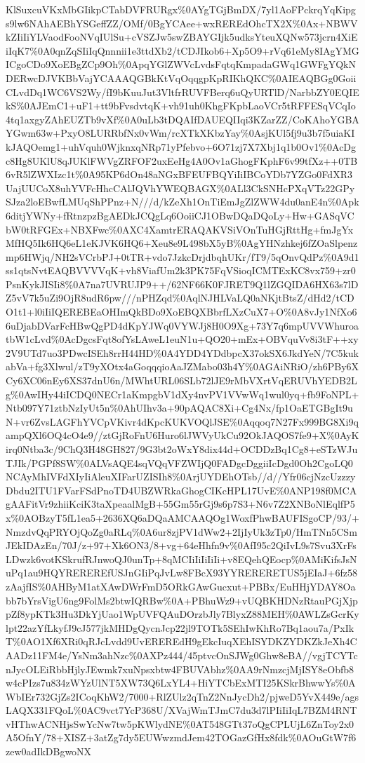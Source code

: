 \documentclass[]{article}
\begin{document}
KlSuxcuVKxMbGIikpCTabDVFRURgx\%0AYgTGjBmDX/7yl1AoFPckrqYqKipgs9lw6NAhAEBhYSGeffZZ/OMf/0BgYCAee+wxREREdOhcTX2X\%0Ax+NBWVkZIiIiYLVaodFooNVqIUlSu+cVSZJw5swZBAYGIjk5udksYteuXQNw573jcrn4XiEiIqK7\%0A0qnZqSIiIqQnnnii1e3ttdXb2/tCDJIkob6+Xp5O9+rVq61eMy8IAgYMGICgoCDo9XoEBgZCp9Oh\%0ApqYGlZWVcLvdsFqtqKmpadaGWq1GWFgYQkNDERwcDJVKBbVajYCAAAQGBkKtVqOqqgpKpRIKhQKC\%0AIEAQBGg0GoiiCLvdDq1WC6VS2Wy/fI9bKuuJut3VltfrRUVFBerq6uQyURTlD/NarbbZY0EQIEkS\%0AJEmC1+uF1+tt9bFvsdvtqK+vh91uh0KhgFKpbLaoVCr5tRFFESqVCqIo4tq1axgyZAhEUZTb9vXf\%0A0uLb3tDQAIfDAUEQIIqi3KZarZZ/CoKAhoYGBAYGwm63w+PxyO8LURRbfNx0vWm/rcXTkXKbzYay\%0AsjKUl5fj9u3b7f5uiaKIkJAQOemg1+uhVquh0WjknxqNRp71yPfebvo+6O71zj7X7Xbj1q1b0Ov1\%0AcDgc8Hg8UKlU8qJUKlFWVgZRFOF2uxEeHg4A0Ov1aGhogFKphF6v99tfXz++0TB6vR5lZWXIzc1t\%0A95KP6dOn48aNGxBFEUFBQYiIiIBCoYDb7YZGo0FdXR3UajUUCoX8uhYVFcHhcCAlJQVhYWEQBAGX\%0ALl3CkSNHcPXqVTz22GPySJza2loEBwfLMUqShPPnz+N///d/kZeXh1OnTiEmJgZlZWW4du0anE4n\%0Apk6ditjYWNy+fRtnzpzBgAEDkJCQgLq6OoiiCJ1OBwDQaDQoLy+Hw+GASqVCbW0tRFGEx+NBXFwc\%0AXC4XamtrERAQAKVSiVOnTuHGjRttHg+fmJgYxMfHQ5Ik6HQ6eL1eKJVK6HQ6+Xeu8e9L498bX5yB\%0AgYHNzhkej6fZOaSlpenzmp6HWjq/NH2sVCrbPJ+0tTR+vdo7JzkcDrjdbqhUKr/fT9/5qOnvQdPz\%0A9d1ss1qtsNvtEAQBVVVVqK+vh8ViafUm2k3PK75FqVSioqICMTExKC8vx759+zr0PsnKykJISIi8\%0A7na7UVRUJP9++/62NF66K0FJRET9Q1lZGQIDA6HX63s7lDZ5vV7k5uZi9OjR8udR6pw///nPHZqd\%0AqlNJHLVaLQ0aNKjtBtsZ/dHd2/tCDO1t1+l0iIiIQEREBEaOHImQkBDo9XoEBQXBbrfLXzCuX7+O\%0A8vJy1NfXo66uDjabDVarFcHBwQgPD4dKpYJWq0VYWJj8H0O9Xg+73Y7q6mpUVVWhuroatbW1cLvd\%0AcDgcsFqt8ofYsLAweL1euN1u+QO20+mEx+OBVquVv8i3tF++xy2V9UTd7uo3PDwcISEh8rrH44HD\%0A4YDD4YDdbpcX37okSX6JkdYeN/7C5kukabVa+fg3Xlwul/zT9yXOtx4aGoqqqioAaJZMabo03h4Y\%0AGAiNRiO/zh6PBy6XCy6XC06nEy6XS37dnU6n/MWhtURL06SLb72lJE9rMbVXrtVqERUVhYEDB2Lg\%0AwIHy44iICDQ0NECr1aKmpgbV1dXy4nvPV1VVwWq1wul0yq+fb9FoNPL+Ntb097Y71ztbNzIyUt5n\%0AhUIhv3a+90pAQAC8Xi+Cg4Nx/fp1OaETGBgIt9uN+vr6ZvsLAGFhYVCpVKivr4dKpcKUKVOQlJSE\%0Aqqoq7N27Fx999BG8Xi9qampQXl6OQ4cO4e9//ztGjRoFnU6Huro6lJWVyUkCu92OkJAQOS7fe9+X\%0AyKirq0Ntba3c/9ChQ3H48GH827/9G3bt2oWxY8dix44d+OCDDzBq1Cg8+eSTzWJuTJIk/PGPf8SW\%0ALVsAQE4sqVQqVFZWIjQ0FADgcDggiiIcDgd0Oh2CgoLQ0NCAyMhIVFdXIyIiAleuXIFarUZISIh8\%0ArjUYDEhOTsb//d//Yfr06cjNzcUzzzyDbdu2ITU1FVarFSdPnoTD4UBZWRkaGhogCIKcHPL17UvE\%0ANP198f0MCAgAAFitVr9zhiiKciK3taXpeaalMgB+55Gm55rGj9s6p7S3+N6v7Z2XNBoNlEqlfP5x\%0AOBzyT5fL1ea5+2636XQ6aDQaAMCAAQOg1WoxfPhwBAUFISgoCP/93/+NmzdvQqPRYOjQoZg0aRLq\%0A6ur8zjPV1dWw2+2IjIyUk3zTp0/HmTNn5CSmJEkIDAzEn/70J/z+97+Xk6ON3/8+vg+64eHhfn9v\%0AfI95c2QiIvL9s7Svu3XrFsLDwzk6votKSkrufRJnwoQJ0unTp+8qMCIiIiIiIiIi+v8EQehQEocp\%0AMiKifsJsNuPq1au9HQYREREREfUSJnGIiPqJvLw8FBcX93YYRERERETUS5jEIaJ+6fz58zAajfIS\%0AHByM1atXAwDWrFmD5ORkGAwGucxut+PBBx/EuHHjYDAY8Oabb7bYrsVigU6ng9FolMs2btwIQRBw\%0A+PBhuWz9+vUQBKHDNzRtauPGjXjppZf8ypKTk3Hu3DkYjUao1WpUVFQAuDOrzbJly7BlyxZ88MEH\%0AWLZsGcrKylpt22azYfLkyfJ9cJ577jkMHDgQycnJcp22jl9TOTk5SEhIwKhRo7Bq1aou7a/PxIkT\%0AO1Xf6XRi0qRJcLvdd9UvEREREdH9gEkcIuqXEhISYDKZYDKZkJeXh4CAADz11FM4e/YsNm3ahNzc\%0AXPz444/45ptvcOnSJWg0Ghw8eBA//vgjTCYTcnJycOLEiRbbHjlyJEwmk7xuNpsxbtw4FBUVAbhz\%0AA9rNmzcjMjISY8eObfb8w4cPIzs7u834zWYzUlNT5XW73Q6LxYL4+HiYTCbExMTI25KSkrBhwwYs\%0AWbIEr732GjZs2ICoqKhW2/7000+RlZUlz2qTnZ2NnJycDh2/pjweD5YvX449e/agsLAQX331FQoL\%0AC9vct7YcP368U/XVajWmTJmC7du3d7lPIiIiIqL7BZM4RNTvHThwACNHjsSwYcNw7tw5pKWlydNE\%0AT548GTt37oQgCPLUjL6ZnToy2x0A5OfnY/78+XISZ+3atZg7dy5EUWwzmdJem42TOGazGfHx8fdk\%0AOuGtW7f6zew0adIkDBgwoNX
\end{document}
